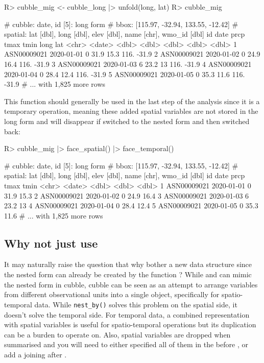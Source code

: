 \documentclass[
]{jss}
\begin{document}
\begin{CodeChunk}
\begin{CodeInput}
R> cubble_mig <- cubble_long |> unfold(long, lat)
R> cubble_mig
\end{CodeInput}
\begin{CodeOutput}
# cubble:  date, id [5]: long form
# bbox:    [115.97, -32.94, 133.55, -12.42]
# spatial: lat [dbl], long [dbl], elev [dbl], name [chr], wmo_id [dbl]
  id          date        prcp  tmax  tmin  long   lat
  <chr>       <date>     <dbl> <dbl> <dbl> <dbl> <dbl>
1 ASN00009021 2020-01-01     0  31.9  15.3  116. -31.9
2 ASN00009021 2020-01-02     0  24.9  16.4  116. -31.9
3 ASN00009021 2020-01-03     6  23.2  13    116. -31.9
4 ASN00009021 2020-01-04     0  28.4  12.4  116. -31.9
5 ASN00009021 2020-01-05     0  35.3  11.6  116. -31.9
# ... with 1,825 more rows
\end{CodeOutput}
\end{CodeChunk}

This function should generally be used in the last step of the analysis since it is a temporary operation, meaning these added spatial variables are not stored in the long form and will disappear if switched to the nested form and then switched back:

\begin{CodeChunk}
\begin{CodeInput}
R> cubble_mig |> face_spatial() |> face_temporal()
\end{CodeInput}
\begin{CodeOutput}
# cubble:  date, id [5]: long form
# bbox:    [115.97, -32.94, 133.55, -12.42]
# spatial: lat [dbl], long [dbl], elev [dbl], name [chr], wmo_id [dbl]
  id          date        prcp  tmax  tmin
  <chr>       <date>     <dbl> <dbl> <dbl>
1 ASN00009021 2020-01-01     0  31.9  15.3
2 ASN00009021 2020-01-02     0  24.9  16.4
3 ASN00009021 2020-01-03     6  23.2  13  
4 ASN00009021 2020-01-04     0  28.4  12.4
5 ASN00009021 2020-01-05     0  35.3  11.6
# ... with 1,825 more rows
\end{CodeOutput}
\end{CodeChunk}

\subsection[Why not just use]{Why not just use }

It may naturally raise the question that why bother a new data structure since the nested form can already be created by the  function ? While  and  can mimic the nested form in cubble, cubble can be seen as an attempt to arrange variables from different observational units into a single object, specifically for spatio-temporal data. While \texttt{nest\_by()} solves this problem on the spatial side, it doesn't solve the temporal side. For temporal data, a combined representation with spatial variables is useful for spatio-temporal operations but its duplication can be a burden to operate on. Also, spatial variables are dropped when summarised and you will need to either specified all of them in the  before , or add a joining after .
\end{document}
